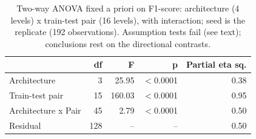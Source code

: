 \begin{table}[htbp]
\centering
\caption{Two-way ANOVA fixed a priori on F1-score: architecture (4 levels) x train-test pair (16 levels), with interaction; seed is the replicate (192 observations). Assumption tests fail (see text); conclusions rest on the directional contrasts.}
\label{tab:anova}
\begin{tabular}{lrrrr}
\toprule
 & df & F & p & Partial eta sq. \\
\midrule
Architecture & 3 & 25.95 & $<$0.0001 & 0.38 \\
Train-test pair & 15 & 160.03 & $<$0.0001 & 0.95 \\
Architecture x Pair & 45 & 2.79 & $<$0.0001 & 0.50 \\
Residual & 128 & -- & -- & 0.50 \\
\bottomrule
\end{tabular}
\end{table}
